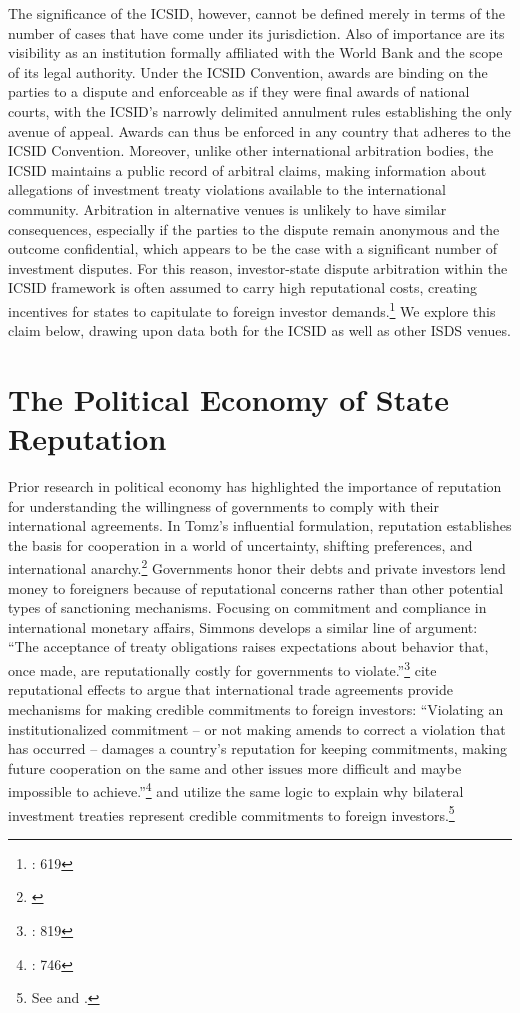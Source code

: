 \documentclass[12pt,onesided]{amsart}
\begin{document}
The significance of the ICSID, however, cannot be defined merely in terms of the number of cases that have come under its jurisdiction. Also of importance are its visibility as an institution formally affiliated with the World Bank and the scope of its legal authority. Under the ICSID Convention, awards are binding on the parties to a dispute and enforceable as if they were final awards of national courts, with the ICSID's narrowly delimited annulment rules establishing the only avenue of appeal. Awards can thus be enforced in any country that adheres to the ICSID Convention. Moreover, unlike other international arbitration bodies, the ICSID maintains a public record of arbitral claims, making information about allegations of investment treaty violations available to the international community. Arbitration in alternative venues is unlikely to have similar consequences, especially if the parties to the dispute remain anonymous and the outcome confidential, which appears to be the case with a significant number of investment disputes. For this reason, investor-state dispute arbitration within the ICSID framework is often assumed to carry high reputational costs, creating incentives for states to capitulate to foreign investor demands.\footnote{\citet{trakman:2013}: 619}  We explore this claim below, drawing upon data both for the ICSID as well as other ISDS venues.

\section*{The Political Economy of State Reputation}

Prior research in political economy has highlighted the importance of reputation for understanding the willingness of governments to comply with their international agreements. In Tomz's influential formulation, reputation establishes the basis for cooperation in a world of uncertainty, shifting preferences, and international anarchy.\footnote{\citet{tomz:2007}} Governments honor their debts and private investors lend money to foreigners because of reputational concerns rather than other potential types of sanctioning mechanisms. Focusing on commitment and compliance in international monetary affairs, Simmons develops a similar line of argument: ``The acceptance of treaty obligations raises expectations about behavior that, once made, are reputationally costly for governments to violate.''\footnote{\citet{simmons:2000}: 819} \citeauthor{buthe:milner:2008} cite reputational effects to argue that international trade agreements provide mechanisms for making credible commitments to foreign investors: ``Violating an institutionalized commitment -- or not making amends to correct a violation that has occurred -- damages a country's reputation for keeping commitments, making future cooperation on the same and other issues more difficult and maybe impossible to achieve.''\footnote{\citet{buthe:milner:2008}: 746}  \citeauthor{buthe:milner:2009} and \citeauthor{elkins:etal:2006} utilize the same logic to explain why bilateral investment treaties represent credible commitments to foreign investors.\footnote{See \citet{buthe:milner:2009} and \citet{elkins:etal:2006}.}
\end{document}
